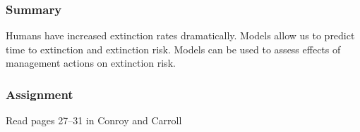 \documentclass[color=usenames,dvipsnames]{beamer}\usepackage[]{graphicx}\usepackage[]{xcolor}
\begin{document}
\begin{frame}
  \frametitle{Summary}
  \large
   Humans have increased extinction rates dramatically. \vfill
   Models allow us to predict time to extinction and extinction risk. \vfill
   Models can be used to assess effects of management actions on
   extinction risk. \vfill
\end{frame}



\begin{frame}
  \frametitle{Assignment}
  \LARGE
  \centering
  Read pages 27--31 in Conroy and Carroll \par
\end{frame}
\end{document}
